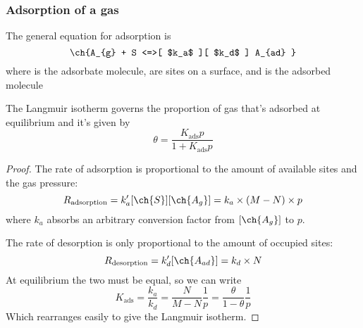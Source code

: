 \subsubsection{Adsorption of a gas}
The general equation for adsorption is
\begin{equation*}
  \ch{A_{g} + S <=>[ $k_a$ ][ $k_d$ ] A_{ad} }
\end{equation*}
where  is the adsorbate molecule,  are sites on a surface, and  is the adsorbed molecule
\begin{thrm}
The Langmuir isotherm governs the proportion of gas that's adsorbed at equilibrium and it's given by
\begin{equation}
  \theta=\frac{K_{\text{ads}}p}{1+K_{\text{ads}}p}
\end{equation}
\end{thrm}
\begin{proof}
  The rate of adsorption is proportional to the amount of available sites and the gas pressure:
  \begin{equation}
    R_{\text{adsorption}}=k'_a[\ch{S}][\ch{A_g}] =k_a\times(M-N)\times p
  \end{equation}
  where $k_a$ absorbs an arbitrary conversion factor from $[\ch{A_g}]$ to $p$.\par
  The rate of desorption is only proportional to the amount of occupied sites:
  \begin{equation}
    R_{\text{desorption}}=k_d'[\ch{A_{ad}}] =k_d\times N
  \end{equation}
  At equilibrium the two must be equal, so we can write
  \begin{equation}
    K_{\text{ads}}=\frac{k_a}{k_d}=\frac{N}{M-N}\frac{1}{p}=\frac{\theta}{1-\theta}\frac{1}{p}
  \end{equation}
  Which rearranges easily to give the Langmuir isotherm.
\end{proof}
